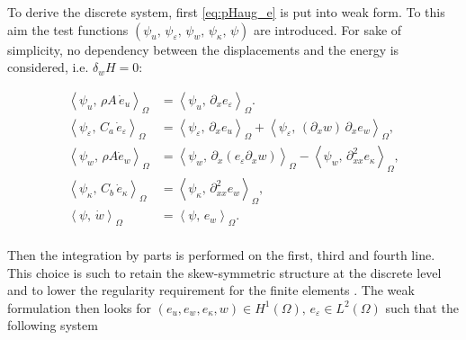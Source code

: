 \documentclass{ifacconf}
\newcommand{\inner}[3][]{\ensuremath{\left\langle #2, \, #3 \right\rangle_{#1}}}
\begin{document}
To derive the discrete system, first \eqref{eq:pHaug_e} is put into weak form. To this aim the test functions $(\psi_u,\, \psi_\varepsilon,\, \psi_w,\, \psi_\kappa,\, \psi)$ are introduced. For sake of simplicity, no dependency between the displacements and the energy is considered, i.e. $\delta_w H=0$:

\begin{equation}
	\begin{aligned}
	\inner[\Omega]{\psi_u}{\rho A \, \dot{e}_u} &= \inner[\Omega]{\psi_u}{\partial_x e_\varepsilon}. \\
	\inner[\Omega]{\psi_\varepsilon}{C_a \, \dot{e}_\varepsilon} &= \inner[\Omega]{\psi_\varepsilon}{\partial_x e_u} + \inner[\Omega]{\psi_\varepsilon}{(\partial_x w) \, \partial_x e_w}, \\
	\inner[\Omega]{\psi_w}{\rho A\dot{e}_w} &= \inner[\Omega]{\psi_w}{\partial_x(e_\varepsilon \partial_x w)} - \inner[\Omega]{\psi_w}{\partial^2_{xx} e_\kappa}, \\
	\inner[\Omega]{\psi_\kappa}{C_b \, \dot{e}_\kappa} &= \inner[\Omega]{\psi_\kappa}{\partial^2_{xx} e_w}, \\
	\inner[\Omega]{\psi}{\dot{w}} &= \inner[\Omega]{\psi}{e_w}. \\
	\end{aligned}
\end{equation}

Then the integration by parts is performed on the first, third and fourth line. This choice is such to retain the skew-symmetric structure at the discrete level and to lower the regularity requirement for the finite elements \cite[Chap. 8]{brugnoli2020thesis}. The weak formulation then looks for $(e_u, e_w, e_\kappa, w) \in H^1(\Omega), \, e_\varepsilon \in L^2(\Omega)$ such that the following system
\end{document}
